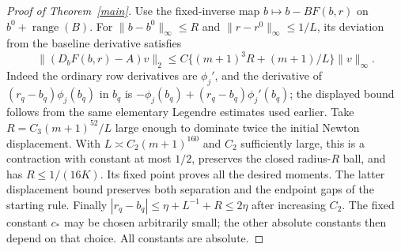 \documentclass[11pt]{article}
\begin{document}
\begin{proof}[Proof of Theorem~\ref{main}]
Use the fixed-inverse map $b\mapsto b-BF(b,r)$ on
$b^0+\operatorname{range}(B)$. For
$\|b-b^0\|_\infty\le R$ and $\|r-r^0\|_\infty\le1/L$,
its deviation from the baseline derivative satisfies
\[
 \|(D_bF(b,r)-A)v\|_2
       \le C\{(m+1)^3R+(m+1)/L\}\|v\|_\infty.
\]
Indeed the ordinary row derivatives are $\phi_j'$, and the derivative
of $(r_q-b_q)\phi_j(b_q)$ in $b_q$ is
$-\phi_j(b_q)+(r_q-b_q)\phi_j'(b_q)$; the displayed bound follows
from the same elementary Legendre estimates used earlier.
Take $R=C_3(m+1)^{52}/L$ large enough to dominate twice the initial
Newton displacement. With $L\asymp C_2(m+1)^{160}$ and $C_2$
sufficiently large, this is a contraction with constant at most
$1/2$, preserves the closed radius-$R$ ball, and has
$R\le1/(16K)$. Its fixed point proves all the desired moments.
The latter displacement bound preserves both separation and the
endpoint gaps of the starting rule. Finally
$|r_q-b_q|\le\eta+L^{-1}+R\le2\eta$ after increasing $C_2$.
The fixed constant $c_*$ may be chosen arbitrarily small; the other
absolute constants then depend on that choice. All constants are absolute.
\end{proof}
\end{document}
